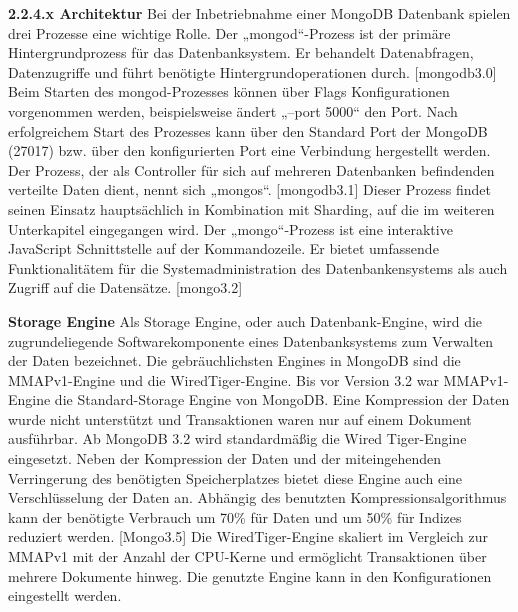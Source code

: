 \textbf{2.2.4.x Architektur}
\newline 
Bei der Inbetriebnahme einer MongoDB Datenbank spielen drei Prozesse eine wichtige  Rolle. \newline Der  „mongod“-Prozess ist der primäre Hintergrundprozess für das Datenbanksystem. Er behandelt Datenabfragen, Datenzugriffe und führt benötigte Hintergrundoperationen durch. [mongodb3.0] Beim Starten des mongod-Prozesses können über Flags Konfigurationen vorgenommen werden, beispielsweise ändert „--port 5000“ den Port. Nach erfolgreichem Start des Prozesses kann über den Standard Port der MongoDB (27017) bzw. über den konfigurierten Port eine Verbindung hergestellt werden.\newline
Der Prozess, der als Controller für sich auf mehreren Datenbanken befindenden verteilte Daten dient, nennt sich „mongos“. [mongodb3.1] Dieser Prozess findet seinen Einsatz hauptsächlich in Kombination mit Sharding, auf die im weiteren Unterkapitel eingegangen wird. \newline
Der „mongo“-Prozess ist eine interaktive JavaScript Schnittstelle auf der Kommandozeile. Er bietet umfassende Funktionalitätem für die Systemadministration des Datenbankensystems als auch Zugriff auf die Datensätze. [mongo3.2]

\textbf{Storage Engine}
\newline
Als Storage Engine, oder auch Datenbank-Engine, wird die zugrundeliegende Softwarekomponente eines Datenbanksystems zum Verwalten der Daten bezeichnet. Die gebräuchlichsten Engines in MongoDB sind die MMAPv1-Engine und die WiredTiger-Engine.\newline
Bis vor Version 3.2 war MMAPv1-Engine die Standard-Storage Engine von MongoDB. Eine Kompression der Daten wurde nicht unterstützt und Transaktionen waren nur auf einem Dokument ausführbar. Ab MongoDB 3.2 wird standardmäßig die Wired Tiger-Engine eingesetzt. Neben der Kompression der Daten und der miteingehenden Verringerung des benötigten Speicherplatzes bietet diese Engine auch eine Verschlüsselung der Daten an. Abhängig des benutzten Kompressionsalgorithmus kann der benötigte Verbrauch um 70\% für Daten und um 50\% für Indizes reduziert werden. [Mongo3.5] Die WiredTiger-Engine skaliert im Vergleich zur MMAPv1 mit der Anzahl der CPU-Kerne und ermöglicht Transaktionen über mehrere Dokumente hinweg. Die genutzte Engine kann in den Konfigurationen eingestellt werden.
\newline


